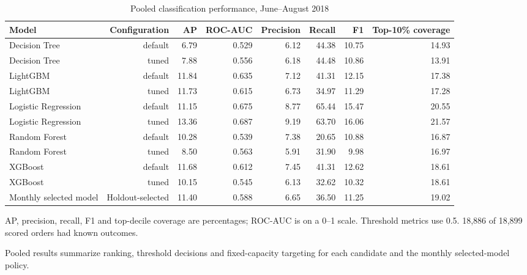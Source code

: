 \begin{table}[htbp]
\centering
\small
\caption{Pooled classification performance, June–August 2018}
\begin{tabular}{lrrrrrrr}
\toprule
Model & Configuration & AP & ROC-AUC & Precision & Recall & F1 & Top-10\% coverage \\
\midrule
Decision Tree & default & 6.79 & 0.529 & 6.12 & 44.38 & 10.75 & 14.93 \\
Decision Tree & tuned & 7.88 & 0.556 & 6.18 & 44.48 & 10.86 & 13.91 \\
LightGBM & default & 11.84 & 0.635 & 7.12 & 41.31 & 12.15 & 17.38 \\
LightGBM & tuned & 11.73 & 0.615 & 6.73 & 34.97 & 11.29 & 17.28 \\
Logistic Regression & default & 11.15 & 0.675 & 8.77 & 65.44 & 15.47 & 20.55 \\
Logistic Regression & tuned & 13.36 & 0.687 & 9.19 & 63.70 & 16.06 & 21.57 \\
Random Forest & default & 10.28 & 0.539 & 7.38 & 20.65 & 10.88 & 16.87 \\
Random Forest & tuned & 8.50 & 0.563 & 5.91 & 31.90 & 9.98 & 16.97 \\
XGBoost & default & 11.68 & 0.612 & 7.45 & 41.31 & 12.62 & 18.61 \\
XGBoost & tuned & 10.15 & 0.545 & 6.13 & 32.62 & 10.32 & 18.61 \\
Monthly selected model & Holdout-selected & 11.40 & 0.588 & 6.65 & 36.50 & 11.25 & 19.02 \\
\bottomrule
\end{tabular}
\par\smallskip\begin{minipage}{\linewidth}\footnotesize AP, precision, recall, F1 and top-decile coverage are percentages; ROC-AUC is on a 0–1 scale. Threshold metrics use 0.5. 18,886 of 18,899 scored orders had known outcomes.\end{minipage}
\end{table}
Pooled results summarize ranking, threshold decisions and fixed-capacity targeting for each candidate and the monthly selected-model policy.
